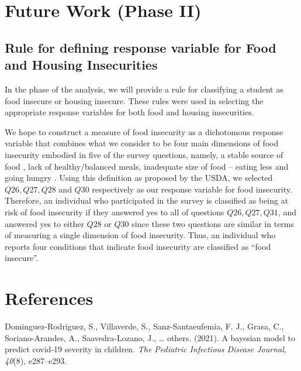 \documentclass[
  10pt,
]{article}
\begin{document}
\hypertarget{future-work-phase-ii}{%
\section{Future Work (Phase II)}\label{future-work-phase-ii}}

\hypertarget{rule-for-defining-response-variable-for-food-and-housing-insecurities}{%
\subsection{Rule for defining response variable for Food and Housing Insecurities}\label{rule-for-defining-response-variable-for-food-and-housing-insecurities}}

In the phase of the analysis, we will provide a rule for classifying a student as food insecure or housing insecure. These rules were used in selecting the appropriate response variables for both food and housing insecurities.

We hope to construct a measure of food insecurity as a dichotomous response variable that combines what we consider to be four main dimensions of food insecurity embodied in five of the survey questions, namely, a stable source of food , lack of healthy/balanced meals, inadequate size of food -- eating less and going hungry . Using this definition as proposed by the USDA, we selected \(Q26, Q27, Q28\) and \(Q30\) respectively as our response variable for food insecurity. Therefore, an individual who participated in the survey is classified as being at risk of food insecurity if they answered yes to all of questions \(Q26, Q27, Q31\), and answered yes to either \(Q28\) or \(Q30\) since these two questions are similar in terms of measuring a single dimension of food insecurity. Thus, an individual who reports four conditions that indicate food insecurity are classified as ``food insecure''.

\hypertarget{references}{%
\section*{References}\label{references}}

\hypertarget{refs}{}
\leavevmode\hypertarget{ref-dominguez2021bayesian}{}%
Dominguez-Rodriguez, S., Villaverde, S., Sanz-Santaeufemia, F. J., Grasa, C., Soriano-Arandes, A., Saavedra-Lozano, J., \ldots{} others. (2021). A bayesian model to predict covid-19 severity in children. \emph{The Pediatric Infectious Disease Journal}, \emph{40}(8), e287--e293.
\end{document}
